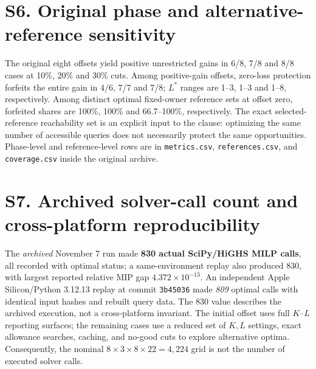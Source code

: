 \documentclass[10pt]{article}
\newcommand{\st}[1]{\texttt{\footnotesize #1}}
\begin{document}
\section*{S6. Original phase and alternative-reference sensitivity}
The original eight offsets yield positive unrestricted gains in 6/8, 7/8 and 8/8 cases at 10\%, 20\% and 30\% cuts. Among positive-gain offsets, zero-loss protection forfeits the entire gain in 4/6, 7/7 and 7/8; $L^*$ ranges are 1--3, 1--3 and 1--8, respectively. Among distinct optimal fixed-owner reference sets at offset zero, forfeited shares are 100\%, 100\% and 66.7--100\%, respectively. The exact selected-reference reachability set is an explicit input to the clause: optimizing the same number of accessible queries does not necessarily protect the same opportunities. Phase-level and reference-level rows are in \st{metrics.csv}, \st{references.csv}, and \st{coverage.csv} inside the original archive.

\section*{S7. Archived solver-call count and cross-platform reproducibility}
The \emph{archived} November 7 run made \textbf{830 actual SciPy/HiGHS MILP calls}, all recorded with optimal status; a same-environment replay also produced 830, with largest reported relative MIP gap $4.372\times10^{-13}$. An independent Apple Silicon/Python 3.12.13 replay at commit \st{3b45036} made \emph{809} optimal calls with identical input hashes and rebuilt query data. The 830 value describes the archived execution, not a cross-platform invariant. The initial offset uses full $K$--$L$ reporting surfaces; the remaining cases use a reduced set of $K,L$ settings, exact allowance searches, caching, and no-good cuts to explore alternative optima. Consequently, the nominal $8\times3\times8\times22=4,224$ grid is not the number of executed solver calls.
\end{document}
